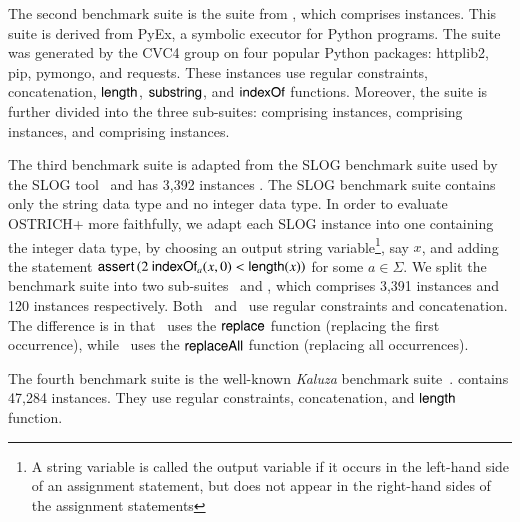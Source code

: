 The second benchmark suite is the {\pyexbench} suite from \cite{ReynoldsWBBLT17}, which comprises  instances. 
This suite is derived from PyEx, a symbolic executor for Python programs. The {\pyexbench} suite was generated by the CVC4 group on four popular Python packages: httplib2, pip, pymongo, and requests. These instances use regular constraints, concatenation, $\mathsf{length}$, $\mathsf{substring}$, and $\mathsf{indexOf}$ functions. Moreover, the {\pyexbench} suite is further divided into the three sub-suites: {\pyextdbench} comprising  instances, {\pyexztbench} comprising  instances, and {\pyexzzbench} comprising  instances.

The third benchmark suite {\slogbench} is adapted from the SLOG benchmark suite used by the SLOG tool~\cite{fang-yu-circuits} and has 3,392 instances . 
The SLOG benchmark suite contains only the string data type and no integer data type.
In order to evaluate OSTRICH+ more faithfully, we adapt each SLOG instance into one containing the integer data type, by choosing an output string variable\footnote{A string variable is called the output variable if it occurs in the left-hand side of an assignment statement, but does not appear in the right-hand sides of the assignment statements}, say $x$, and adding the statement $\ASSERT{2\ \indexof_{a}(x, 0) < \length(x)}$ for some $a \in \Sigma$.
We split the {\slogbench} benchmark suite into two sub-suites \slogbenchr\ and \slogbenchra, which comprises 3,391 instances  and 120 instances  respectively. Both  \slogbenchr\ and \slogbenchra\ use regular constraints and concatenation. The difference is in that \slogbenchr\ uses the $\mathsf{replace}$ function (replacing the first occurrence), while \slogbenchra\ uses the $\mathsf{replaceAll}$ function (replacing all occurrences).


The fourth benchmark suite {\kaluzabench} is the well-known \emph{Kaluza} benchmark suite~\cite{Berkeley-JavaScript}.
{\kaluzabench} contains 47,284 instances. They use regular constraints, concatenation, and $\mathsf{length}$ function.





